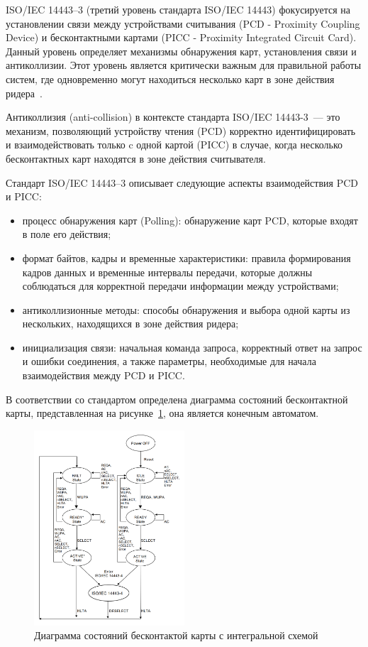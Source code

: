 ISO/IEC 14443--3 (третий уровень стандарта ISO/IEC 14443) фокусируется на установлении связи между устройствами считывания (PCD - Proximity Coupling Device) и бесконтактными картами (PICC - Proximity Integrated Circuit Card).
Данный уровень определяет механизмы обнаружения карт, установления связи и антиколлизии.
Этот уровень является критически важным для правильной работы систем, где одновременно могут находиться несколько карт в зоне действия ридера~\cite{iso14443-3}.

Антиколлизия (anti-collision) в контексте стандарта ISO/IEC 14443-3~--- это механизм, позволяющий устройству чтения (PCD) корректно идентифицировать и взаимодействовать только c одной картой (PICC) в случае, когда несколько бесконтактных карт находятся в зоне действия считывателя.

Стандарт ISO/IEC 14443--3 описывает следующие аспекты взаимодействия PCD и PICC:

\begin{itemize}
    \item процесс обнаружения карт (Polling): обнаружение карт PCD, которые входят в поле его действия;
    \item формат байтов, кадры и временные характеристики: правила формирования кадров данных и временные интервалы передачи, которые должны соблюдаться для корректной передачи информации между устройствами;
    \item антиколлизионные методы: способы обнаружения и выбора одной карты из нескольких, находящихся в зоне действия ридера;
    \item инициализация связи: начальная команда запроса, корректный ответ на запрос и ошибки соединения, а также параметры, необходимые для начала взаимодействия между PCD и PICC.
\end{itemize}

В соответствии со стандартом определена диаграмма состояний бесконтактной карты, представленная на рисунке~\ref{fig:picc_states}, она является конечным автоматом.

\begin{figure}[H]
    \centering
    \includegraphics[width=0.5\textwidth]{images/research/picc_states}
    \caption{\centering Диаграмма состояний бесконтактой карты с интегральной схемой}
    \label{fig:picc_states}
\end{figure}


